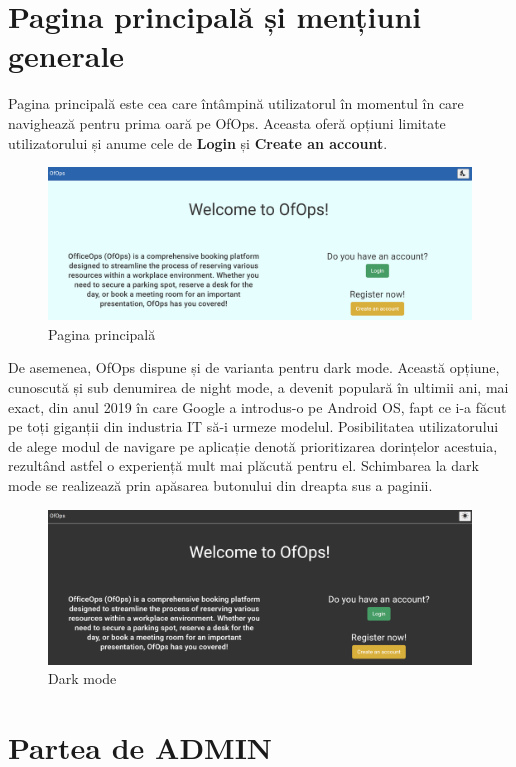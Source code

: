 \section{Pagina principală și mențiuni generale}

Pagina principală este cea care întâmpină utilizatorul în momentul în care navighează pentru prima oară pe OfOps. Aceasta oferă opțiuni limitate utilizatorului și anume cele de \textbf{Login} și \textbf{Create an account}.

\begin{figure}[!htb]
    \centering
    \includegraphics[width=0.9\linewidth]{images/pagina-nelogat.png}
    \caption{Pagina principală}
    \label{fig:principal}
\end{figure}

De asemenea, OfOps dispune și de varianta pentru dark mode. Această opțiune, cunoscută și sub denumirea de night mode, a devenit populară în ultimii ani, mai exact, din anul 2019 în care Google a introdus-o pe Android OS, fapt ce i-a făcut pe toți giganții din industria IT să-i urmeze modelul.\cite{citation9} Posibilitatea utilizatorului de alege modul de navigare pe aplicație denotă prioritizarea dorințelor acestuia, rezultând astfel o experiență mult mai plăcută pentru el. Schimbarea la dark mode se realizează prin apăsarea butonului din dreapta sus a paginii.

\begin{figure}[!htb]
    \centering
    \includegraphics[width=0.9\linewidth]{images/dark.png}
    \caption{Dark mode}
    \label{fig:dark}
\end{figure}

\section{Partea de ADMIN}

